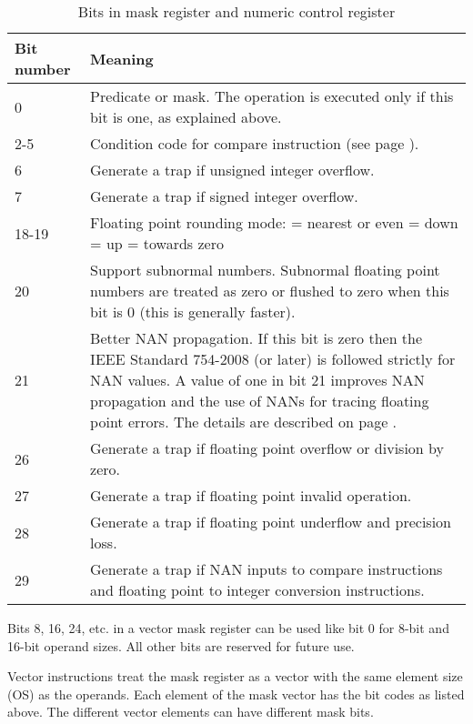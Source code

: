 \documentclass[forwardcom.tex]{subfiles}
\begin{document}
\begin{longtable}
{|p{15mm}|p{90mm}|}
\caption{Bits in mask register and numeric control register}
\label{table:maskBits}
\endfirsthead
\endhead
\hline
\bfseries Bit number & \bfseries Meaning \\
 \hline
0 & Predicate or mask. The operation is executed only if this bit is one, as explained above.\\
\hline
2-5 & Condition code for compare instruction (see page \pageref{compare}).\\
\hline
6 & Generate a trap if unsigned integer overflow. \\
\hline
7 & Generate a trap if signed integer overflow. \\

\hline
18-19 & Floating point rounding mode: \newline
00 = nearest or even \newline
01 = down \newline
10 = up \newline
11 = towards zero \\
\hline
20 & Support subnormal numbers. Subnormal floating point numbers are treated as zero or flushed to zero when this bit is 0 (this is generally faster). \\
\hline
21 & Better NAN propagation. If this bit is zero then the IEEE Standard 754-2008 (or later) is followed strictly for NAN values. A value of one in bit 21 improves NAN propagation and the use of NANs for tracing floating point errors. The details are described on page \pageref{nanPropagation}. \\
\hline
26 & Generate a trap if floating point overflow or division by zero.  \\
\hline
27 & Generate a trap if floating point invalid operation. \\
\hline
28 & Generate a trap if floating point underflow and precision loss. \\
\hline
29 & Generate a trap if NAN inputs to compare instructions and floating point to integer conversion instructions.\\
\hline
\end{longtable}

Bits 8, 16, 24, etc. in a vector mask register can be used like bit 0 for 8-bit and 16-bit operand sizes. All other bits are reserved for future use.
\vspace{2mm}

Vector instructions treat the mask register as a vector with the same element size (OS) as the operands. Each element of the mask vector has the bit codes as listed above. The different vector elements can have different mask bits.
\vspace{2mm}
\end{document}
